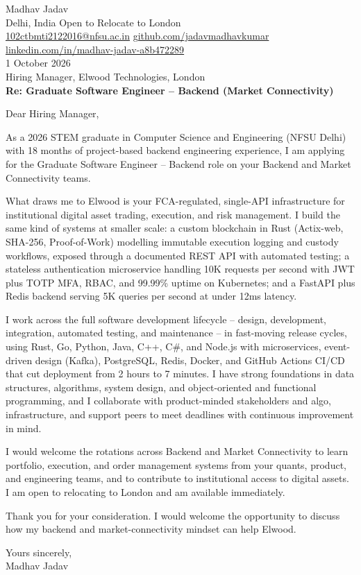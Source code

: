 \documentclass[10pt,letterpaper]{article}
\begin{document}
\begin{flushleft}
Madhav Jadav\\
Delhi, India \textbar{} Open to Relocate to London\\
\href{mailto:102ctbmti2122016@nfsu.ac.in}{102ctbmti2122016@nfsu.ac.in} \textbar{} \href{https://github.com/jadavmadhavkumar}{github.com/jadavmadhavkumar} \textbar{} \href{https://www.linkedin.com/in/madhav-jadav-a8b472289}{linkedin.com/in/madhav-jadav-a8b472289}\\[8pt]
1 October 2026\\[4pt]
Hiring Manager, Elwood Technologies, London\\[8pt]
\textbf{Re: Graduate Software Engineer -- Backend (Market Connectivity)}\\[8pt]
\end{flushleft}
Dear Hiring Manager,

As a 2026 STEM graduate in Computer Science and Engineering (NFSU Delhi) with 18 months of project-based backend engineering experience, I am applying for the Graduate Software Engineer -- Backend role on your Backend and Market Connectivity teams.

What draws me to Elwood is your FCA-regulated, single-API infrastructure for institutional digital asset trading, execution, and risk management. I build the same kind of systems at smaller scale: a custom blockchain in Rust (Actix-web, SHA-256, Proof-of-Work) modelling immutable execution logging and custody workflows, exposed through a documented REST API with automated testing; a stateless authentication microservice handling 10K requests per second with JWT plus TOTP MFA, RBAC, and 99.99\% uptime on Kubernetes; and a FastAPI plus Redis backend serving 5K queries per second at under 12ms latency.

I work across the full software development lifecycle -- design, development, integration, automated testing, and maintenance -- in fast-moving release cycles, using Rust, Go, Python, Java, C++, C\#, and Node.js with microservices, event-driven design (Kafka), PostgreSQL, Redis, Docker, and GitHub Actions CI/CD that cut deployment from 2 hours to 7 minutes. I have strong foundations in data structures, algorithms, system design, and object-oriented and functional programming, and I collaborate with product-minded stakeholders and algo, infrastructure, and support peers to meet deadlines with continuous improvement in mind.

I would welcome the rotations across Backend and Market Connectivity to learn portfolio, execution, and order management systems from your quants, product, and engineering teams, and to contribute to institutional access to digital assets. I am open to relocating to London and am available immediately.

Thank you for your consideration. I would welcome the opportunity to discuss how my backend and market-connectivity mindset can help Elwood.

Yours sincerely,\\[8pt]
Madhav Jadav
\end{document}

